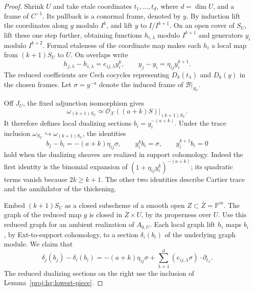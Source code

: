 \documentclass[11pt,letterpaper]{article}
\theoremstyle{definition}
\theoremstyle{remark}
\begin{document}
\begin{proof}
Shrink \(U\) and take etale coordinates \(t_1,\ldots,t_d\),
where \(d=\dim U\), and a frame of \(C^{-1}\).  Its pullback is
a conormal frame, denoted by \(y\).  By induction lift the
coordinates along \(g\) modulo \(I^k\), and lift \(y\) to
\(I/I^{k+1}\).  On an open cover of \(S_U\), lift these one step
further, obtaining functions \(h_{i,\lambda}\) modulo \(I^{k+1}\)
and generators \(y_i\) modulo \(I^{k+2}\).  Formal etaleness of
the coordinate map makes each \(h_i\) a local map from
\((k+1)S_U\) to \(U\).  On overlaps write
\begin{equation}\label{proj:hg:coordinate-errors}
 h_{j,\lambda}-h_{i,\lambda}
       =e_{ij,\lambda}y_i^k,
 \qquad
 y_j-y_i=\eta_{ij}y_i^{k+1}.
\end{equation}
The reduced coefficients are Cech cocycles representing
\(D_k(t_\lambda)\) and \(D_k(y)\) in the chosen frames.
Let \(\sigma=y^{-a}\) denote the induced frame of
\(\mathcal B|_{S_U}\).

Off \(J_U\), the fixed adjunction isomorphism gives
\[
 \omega_{(k+1)S_U}
 \simeq\mathcal{O}_{\mathcal X}((a+k)S)|_{(k+1)S_U}.
\]
It therefore defines local dualizing sections
\(b_i=y_i^{-(a+k)}\).  Under the trace inclusion
\(\omega_{S_U}\hookrightarrow\omega_{(k+1)S_U}\), the identities
\begin{equation}\label{proj:hg:dualizing-errors}
 b_j-b_i=-(a+k)\eta_{ij}\sigma,\qquad
 y_i^kb_i=\sigma,\qquad y_i^{k+1}b_i=0
\end{equation}
hold when the dualizing sheaves are realized in support
cohomology.  Indeed the first identity is the binomial expansion
of \((1+\eta_{ij}y_i^k)^{-(a+k)}\); its quadratic terms vanish
because \(2k\geq k+1\).  The other two identities describe
Cartier trace and the annihilator of the thickening.

Embed \((k+1)S_U\) as a closed subscheme of a smooth open
\(Z\subset\overline Z=\mathbb{P}^m\).  The graph of the reduced map
\(g\) is closed in \(\overline Z\times U\), by its properness over
\(U\).  Use this reduced graph for an ambient realization of
\(A_{0,U}\).  Each local graph lift \(h_i\) maps \(b_i\), by
Ext-to-support cohomology, to a section \(\delta_i(b_i)\) of the
underlying graph module.  We claim that
\begin{equation}\label{proj:hg:graph-identity}
 \delta_j(b_j)-\delta_i(b_i)
 =
 -(a+k)\eta_{ij}\sigma
 +\sum_{\lambda=1}^d
          (e_{ij,\lambda}\sigma)\cdot\partial_{t_\lambda}.
\end{equation}
The reduced dualizing sections on the right use the inclusion
of Lemma~\ref{proj:hg:lowest-piece}.


\end{proof}
\end{document}
